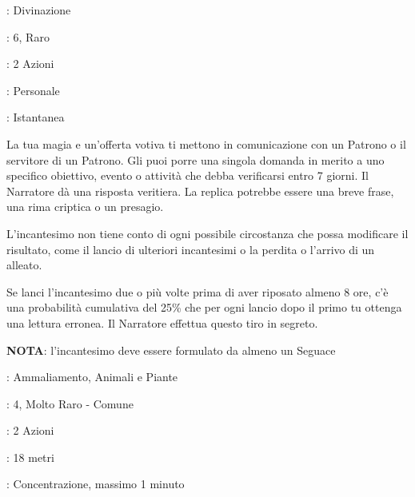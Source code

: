 \begin{multicols}{2}
\noindent\colorbox{OBSSgold!10}{
\begin{minipage}{0.95\linewidth}
\begin{description}[noitemsep, topsep=0pt, parsep=0pt, partopsep=0pt, leftmargin=0cm, labelwidth=1.3cm]
	\item[\textbf{Lista}]: Divinazione
	\item[\textbf{Livello}]: 6, Raro
	\item[\textbf{Lancio}]: 2 Azioni
	\item[\textbf{Gittata}]: Personale
	\item[\textbf{Durata}]: Istantanea
\end{description}
\end{minipage}}\smallskip

La tua magia e un'offerta votiva ti mettono in comunicazione con un Patrono o il servitore di un Patrono. Gli puoi porre una singola domanda in merito a uno specifico obiettivo, evento o attività che debba verificarsi entro 7 giorni. Il Narratore dà una risposta veritiera. La replica potrebbe essere una breve frase, una rima criptica o un presagio.

L'incantesimo non tiene conto di ogni possibile circostanza che possa modificare il risultato, come il lancio di ulteriori incantesimi o la perdita o l'arrivo di un alleato.

Se lanci l'incantesimo due o più volte prima di aver riposato almeno 8 ore, c'è una probabilità cumulativa del 25\% che per ogni lancio dopo il primo tu ottenga una lettura erronea. Il Narratore effettua questo tiro in segreto.

\textbf{NOTA}: l'incantesimo deve essere formulato da almeno un Seguace

\noindent\colorbox{OBSSgold!10}{
\begin{minipage}{0.95\linewidth}
\begin{description}[noitemsep, topsep=0pt, parsep=0pt, partopsep=0pt, leftmargin=0cm, labelwidth=1.3cm]
	\item[\textbf{Lista}]: Ammaliamento, Animali e Piante
	\item[\textbf{Livello}]: 4, Molto Raro - Comune
	\item[\textbf{Lancio}]: 2 Azioni
	\item[\textbf{Gittata}]: 18 metri
	\item[\textbf{Durata}]: Concentrazione, massimo 1 minuto
\end{description}
\end{minipage}}\smallskip


\end{multicols}
